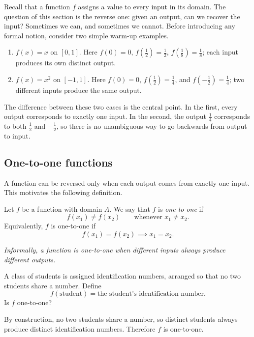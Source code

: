 Recall that a function \(f\) assigns a value to every input in its domain. The question of this section is the reverse one: given an output, can we recover the input? Sometimes we can, and sometimes we cannot. Before introducing any formal notion, consider two simple warm-up examples.

\begin{enumerate}
    \item \(f(x) = x\) on \([0, 1]\). Here \(f(0) = 0\), \(f(\tfrac{1}{2}) = \tfrac{1}{2}\), \(f(\tfrac{1}{8}) = \tfrac{1}{8}\); each input produces its own distinct output.
    \item \(f(x) = x^{2}\) on \([-1, 1]\). Here \(f(0) = 0\), \(f(\tfrac{1}{2}) = \tfrac{1}{4}\), and \(f(-\tfrac{1}{2}) = \tfrac{1}{4}\); two different inputs produce the same output.
\end{enumerate}

The difference between these two cases is the central point. In the first, every output corresponds to exactly one input. In the second, the output \(\tfrac{1}{4}\) corresponds to both \(\tfrac{1}{2}\) and \(-\tfrac{1}{2}\), so there is no unambiguous way to go backwards from output to input.

\subsection{One-to-one functions}

A function can be reversed only when each output comes from exactly one input. This motivates the following definition.

\begin{definition}
Let \(f\) be a function with domain \(A\). We say that \(f\) is \emph{one-to-one} if
\[
f(x_{1}) \neq f(x_{2}) \qquad \text{whenever } x_{1} \neq x_{2}.
\]
Equivalently, \(f\) is one-to-one if
\[
f(x_{1}) = f(x_{2}) \implies x_{1} = x_{2}.
\]

\emph{Informally, a function is one-to-one when different inputs always produce different outputs.}
\end{definition}

\begin{workedexample}
\begin{example}
A class of students is assigned identification numbers, arranged so that no two students share a number. Define
\[
f(\text{student}) = \text{the student's identification number}.
\]
Is \(f\) one-to-one?
\end{example}

\begin{solution}
By construction, no two students share a number, so distinct students always produce distinct identification numbers. Therefore \(f\) is one-to-one.
\end{solution}
\end{workedexample}

